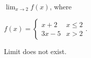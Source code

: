 {$\displaystyle \lim_{x\to 2} f(x)$, where 

$f(x) = \left\{\begin{array}{cl} x+2 & x\leq 2 \\ 3x-5 & x>2 \end{array}\right.$.}
{Limit does not exist.}



